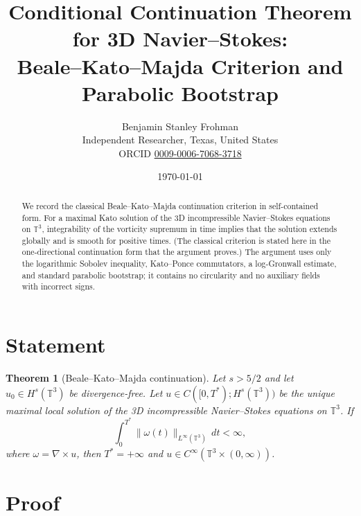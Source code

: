 \documentclass[11pt,a4paper]{article}
\title{Conditional Continuation Theorem for 3D Navier--Stokes:\\Beale--Kato--Majda Criterion and Parabolic Bootstrap}
\author{Benjamin Stanley Frohman\\
\small Independent Researcher, Texas, United States\\
\small ORCID \href{https://orcid.org/0009-0006-7068-3718}{0009-0006-7068-3718}}
\date{\today}
\newtheorem{theorem}{Theorem}[section]
\begin{document}
\maketitle
{}\par\medskip

\begin{abstract}
We record the classical Beale--Kato--Majda continuation criterion in self-contained form. For a maximal Kato solution of the 3D incompressible Navier--Stokes equations on \(\mathbb{T}^3\), integrability of the vorticity supremum in time implies that the solution extends globally and is smooth for positive times. (The classical criterion is stated here in the one-directional continuation form that the argument proves.) The argument uses only the logarithmic Sobolev inequality, Kato--Ponce commutators, a log-Gronwall estimate, and standard parabolic bootstrap; it contains no circularity and no auxiliary fields with incorrect signs.
\end{abstract}

\section{Statement}

\begin{theorem}[Beale--Kato--Majda continuation]
Let \(s>5/2\) and let \(u_0\in H^s(\mathbb{T}^3)\) be divergence-free. Let \(u\in C([0,T^*);H^s(\mathbb{T}^3))\) be the unique maximal local solution of the 3D incompressible Navier--Stokes equations on \(\mathbb{T}^3\). If
\begin{equation}\label{eq:formB}
\int_0^{T^*}\|\omega(t)\|_{L^\infty(\mathbb{T}^3)}\,dt<\infty,
\end{equation}
where \(\omega=\nabla\times u\), then \(T^*=+\infty\) and \(u\in C^\infty(\mathbb{T}^3\times(0,\infty))\).
\end{theorem}

\section{Proof}
\end{document}
